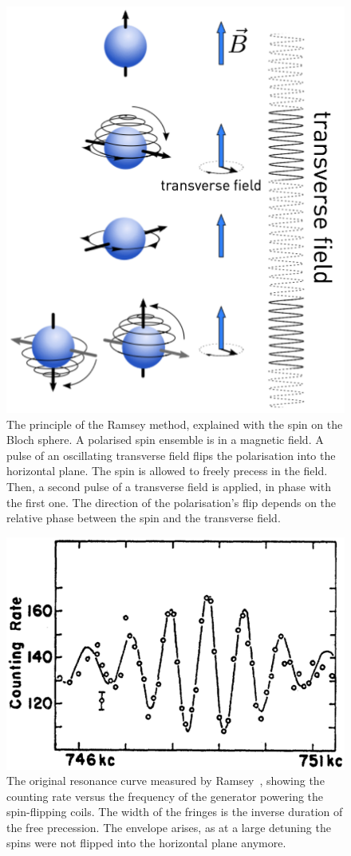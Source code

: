 \begin{figure}
  \centering
  \includegraphics[width=.6\linewidth]{gfx/nEDMatPSI/Ramsey_principle.png}
  \caption{The principle of the Ramsey method, explained with the spin on the Bloch sphere. A polarised spin ensemble is in a magnetic field. A pulse of an oscillating transverse field flips the polarisation into the horizontal plane. The spin is allowed to freely precess in the field. Then, a second pulse of a transverse field is applied, in phase with the first one. The direction of the polarisation's flip depends on the relative phase between the spin and the transverse field.}\label{fig:nEDM_Ramsey_principle}
\end{figure}

\begin{figure}
  \centering
  \includegraphics[width=.6\linewidth]{gfx/introduction/Ramsey_original_resonance.png}
  \caption{The original resonance curve measured by Ramsey~\cite{PhysRev.108.120}, showing the counting rate versus the frequency of the generator powering the spin-flipping coils.
  The width of the fringes is the inverse duration of the free precession. The envelope arises, as at a large detuning the spins were not flipped into the horizontal plane anymore.}\label{fig:nEDM_Ramsey_original_curve}
\end{figure}

